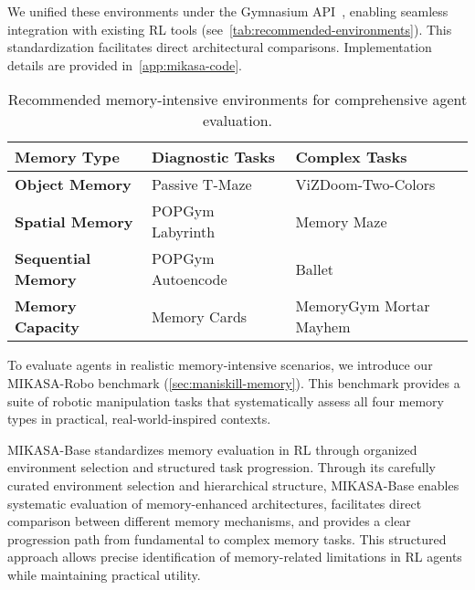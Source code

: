 We unified these environments under the Gymnasium API~\citep{towers2024gymnasium}, enabling seamless integration with existing RL tools (see~\autoref{tab:recommended-environments}). This standardization facilitates direct architectural comparisons. Implementation details are provided in~\autoref{app:mikasa-code}.

\begin{table}[t]
    \small
    \centering
    \caption{Recommended memory-intensive environments for comprehensive agent evaluation.}
    \vspace{-10pt}
    \label{tab:recommended-environments}
    \begin{adjustbox}{width=1\textwidth}
    \begin{tabular}{lll}
        \toprule
        \textbf{Memory Type} & \textbf{Diagnostic Tasks} & \textbf{Complex Tasks} \\
        \midrule
        \textbf{Object Memory} & Passive T-Maze~\citep{shine_rl} & ViZDoom-Two-Colors~\citep{sorokin2022explain} \\
        \textbf{Spatial Memory} & POPGym Labyrinth~\citep{popgym2023} & Memory Maze~\citep{memory_maze} \\
        \textbf{Sequential Memory} & POPGym Autoencode~\citep{popgym2023} & Ballet~\citep{hcam} \\
        \textbf{Memory Capacity} & Memory Cards~\citep{esslinger2022dtqn} & MemoryGym Mortar Mayhem~\citep{pleines2023memory} \\
        \bottomrule
    \end{tabular}
    \end{adjustbox}
\vspace{-15pt}
\end{table}

To evaluate agents in realistic memory-intensive scenarios, we introduce our MIKASA-Robo benchmark (\autoref{sec:maniskill-memory}). This benchmark provides a suite of robotic manipulation tasks that systematically assess all four memory types in practical, real-world-inspired contexts.

MIKASA-Base standardizes memory evaluation in RL through organized environment selection and structured task progression. Through its carefully curated environment selection and hierarchical structure, MIKASA-Base enables systematic evaluation of memory-enhanced architectures, facilitates direct comparison between different memory mechanisms, and provides a clear progression path from fundamental to complex memory tasks. This structured approach allows precise identification of memory-related limitations in RL agents while maintaining practical utility.